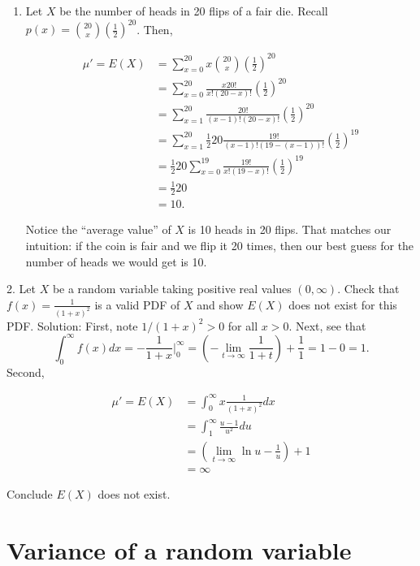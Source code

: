 \documentclass[]{book}
\providecommand{\tightlist}{%
  \setlength{\itemsep}{0pt}\setlength{\parskip}{0pt}}
\begin{document}
\begin{enumerate}
\def\labelenumi{\arabic{enumi}.}
\tightlist
\item
  Let \(X\) be the number of heads in 20 flips of a fair die. Recall
  \(p(x) = {20 \choose x}\left(\frac12\right)^20\). Then,

  \begin{align*}
  \mu' = E(X) &= \sum_{x = 0}^{20} x {20 \choose x}\left(\frac12\right)^{20}\\
  &=  \sum_{x = 0}^{20} \frac{x20!}{x!(20-x)!}\left(\frac12\right)^{20}\\
  &=  \sum_{x = 1}^{20} \frac{20!}{(x-1)!(20-x)!}\left(\frac12\right)^{20}\\
  &=  \sum_{x = 1}^{20} \frac12 20\frac{19!}{(x-1)!(19-(x-1))!}\left(\frac12\right)^{19}\\
  & = \frac12 20 \sum_{x = 0}^{19} \frac{19!}{x!(19-x)!}\left(\frac12\right)^{19}\\
  & = \frac12 20\\
  & = 10.
  \end{align*}

  Notice the ``average value'' of \(X\) is 10 heads in 20 flips. That
  matches our intuition: if the coin is fair and we flip it 20 times,
  then our best guess for the number of heads we would get is 10.
\end{enumerate}

 2. Let \(X\) be a random variable taking positive real values
\((0,\infty)\). Check that \(f(x) = \frac{1}{(1+x)^2}\) is a valid PDF
of \(X\) and show \(E(X)\) does not exist for this PDF. Solution: First,
note \(1/(1+x)^2 > 0\) for all \(x>0\). Next, see that
\[\int_0^\infty f(x)dx = -\frac{1}{1+x}|_0^\infty = \left(-\lim_{t\rightarrow \infty}\frac{1}{1+t}\right) + \frac{1}{1} = 1-0 = 1.\]
Second,

\begin{align*}
\mu' = E(X) &= \int_{0}^\infty x\frac{1}{(1+x)^2}dx\\
&= \int_1^\infty \frac{u-1}{u^2}du\\
&= \left(\lim_{t\rightarrow \infty} \ln u - \frac{1}{u}\right) + 1 \\
&= \infty
\end{align*}

Conclude \(E(X)\) does not exist.

\section{Variance of a random
variable}\label{variance-of-a-random-variable}
\end{document}
